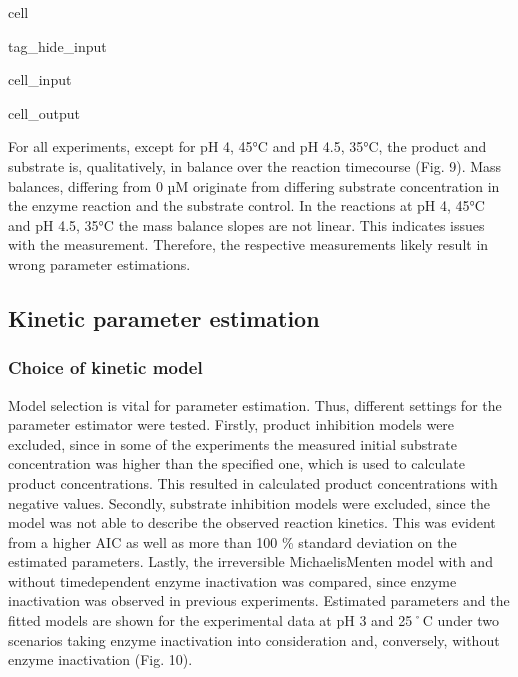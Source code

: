 \documentclass[letterpaper,12pt,english]{jupyterBook}
\begin{document}
\begin{sphinxuseclass}{cell}
\begin{sphinxuseclass}{tag_hide_input}
\begin{sphinxVerbatimInput}
\begin{sphinxuseclass}{cell_input}
\end{sphinxuseclass}\end{sphinxVerbatimInput}
\begin{sphinxVerbatimOutput}

\begin{sphinxuseclass}{cell_output}
\noindent{}

\end{sphinxuseclass}\end{sphinxVerbatimOutput}

\end{sphinxuseclass}
\end{sphinxuseclass}
\sphinxAtStartPar
{}

\sphinxAtStartPar
For all experiments, except for pH 4, 45°C and pH 4.5, 35°C, the product and substrate is, qualitatively, in balance over the reaction time\sphinxhyphen{}course (Fig. 9). Mass balances, differing from 0 µM originate from differing substrate concentration in the enzyme reaction and the substrate control. In the reactions at pH 4, 45°C and pH 4.5, 35°C the mass balance slopes are not linear. This indicates issues with the measurement. Therefore, the respective measurements likely result in wrong parameter estimations.


\subsection{Kinetic parameter estimation}
\label{\detokenize{scenarios/SLAC_kinetic_characterization:kinetic-parameter-estimation}}

\subsubsection{Choice of kinetic model}
\label{\detokenize{scenarios/SLAC_kinetic_characterization:choice-of-kinetic-model}}
\sphinxAtStartPar
Model selection is vital for parameter estimation. Thus, different settings for the parameter estimator were tested. Firstly, product inhibition models were excluded, since in some of the experiments the measured initial substrate concentration was higher than the specified one, which is used to calculate product concentrations. This resulted in calculated product concentrations with negative values. Secondly, substrate inhibition models were excluded, since the model was not able to describe the observed reaction kinetics. This was evident from a higher AIC as well as more than 100 \% standard deviation on the estimated parameters. Lastly, the irreversible Michaelis\sphinxhyphen{}Menten model with and without time\sphinxhyphen{}dependent enzyme inactivation was compared, since enzyme inactivation was observed in previous experiments. Estimated parameters and the fitted models are shown for the experimental data at pH 3 and 25˚C under two scenarios \sphinxhyphen{} taking enzyme inactivation into consideration and, conversely, without enzyme inactivation (Fig. 10).
\end{document}

